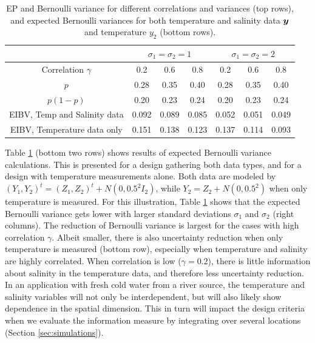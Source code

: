 \documentclass[aoas]{imsart}
\begin{document}
\begin{table}[!h] \centering \caption{EP and Bernoulli variance for
    different correlations and variances (top rows), and expected
    Bernoulli variances for both temperature and salinity data ${\boldsymbol y}$ and 
    temperature $y_2$ (bottom rows).}
  \begin{tabular}{c|ccc|ccc}
 &\multicolumn{3}{c}{$\sigma_1=\sigma_2=1$} & \multicolumn{3}{c}{$\sigma_1=\sigma_2=2$} \\
\hline
Correlation $\gamma$ & 0.2 & 0.6 & 0.8 & 0.2 & 0.6 & 0.8 \\
\hline
$p$ & 0.28 & 0.35 & 0.40 & 0.28 & 0.35 & 0.40 \\ 
$p(1-p)$ & 0.20 & 0.23 & 0.24 & 0.20 & 0.23 & 0.24 \\ 
EIBV, Temp and Salinity data & 0.092 & 0.089 & 0.085 & 0.052 & 0.051 & 0.049 \\ 
EIBV, Temperature data only & 0.151 & 0.138 & 0.123 & 0.137 & 0.114 & 0.093 \\ 
\hline
\end{tabular}
\label{tab:sim_rhoab}
\end{table}

Table \ref{tab:sim_rhoab} (bottom two rows) shows results of expected
Bernoulli variance calculations. This is presented for a design
gathering both data types, and for a design with
temperature measurements alone. Both data are modeled by $(Y_1,Y_2)^t=(Z_1,Z_2)^t+N(0,0.5^2I_2)$, while
$Y_2=Z_2+N(0,0.5^2)$ when only temperature is measured.  For this
illustration, Table \ref{tab:sim_rhoab} shows that the expected
Bernoulli variance gets lower with larger standard deviations
$\sigma_1$ and $\sigma_2$ (right columns). The reduction of Bernoulli
variance is largest for the cases with high correlation
$\gamma$. Albeit smaller, there is also uncertainty reduction when
only temperature is measured (bottom row), especially when temperature
and salinity are highly correlated. When correlation is low
($\gamma=0.2$), there is little information about salinity in the
temperature data, and therefore less uncertainty reduction. In an
application with fresh cold water from a river source, the temperature
and salinity variables will not only be interdependent, but will also
likely show dependence in the spatial dimension. This in turn will
impact the design criteria when we evaluate the information measure by
integrating over several locations (Section \ref{sec:simulations}).

\end{document}
